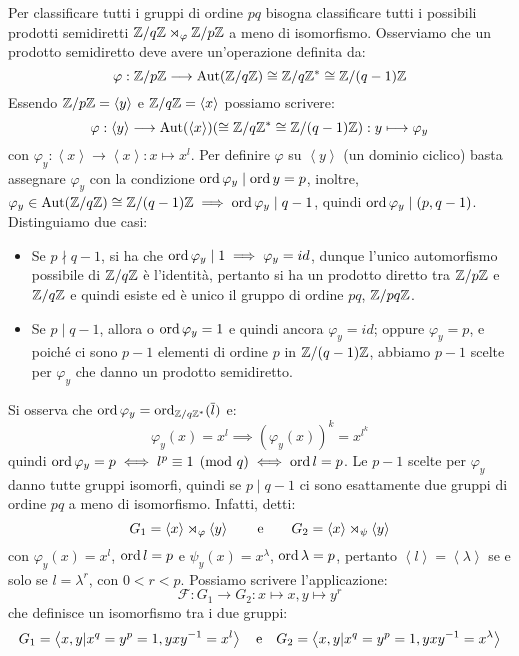 \documentclass[11pt]{scrartcl}
\begin{document}
Per classificare tutti i gruppi di ordine $pq$ bisogna classificare tutti i possibili prodotti semidiretti $\mathbb Z/q\mathbb Z \rtimes_{\varphi} {\mathbb Z}/p{\mathbb Z}$ a meno di isomorfismo.
Osserviamo che un prodotto semidiretto deve avere un'operazione definita da:
\[ \varphi : {\mathbb Z}/p{\mathbb Z} \longrightarrow \operatorname{Aut}(\mathbb Z/q\mathbb Z) \cong \mathbb Z/q\mathbb Z^* \cong \mathbb Z/(q-1)\mathbb Z
            \]
Essendo ${\mathbb Z}/p{\mathbb Z} = \left<y\right>$ e $\mathbb Z/q\mathbb Z = \left<x\right>$ possiamo scrivere:
    \[ \varphi : \left<y\right> \longrightarrow \operatorname{Aut}(\left<x\right>) (\cong \mathbb Z/q\mathbb Z^* \cong \mathbb Z/(q-1)\mathbb Z) : y \longmapsto \varphi_y
            \]
con $\varphi_y : \left<x\right> \longrightarrow \left<x\right> : x \longmapsto x^l$. Per definire $\varphi$ su $\left<y\right>$ (un dominio ciclico)
basta assegnare $\varphi_y$ con la condizione $\operatorname{ord} \varphi_y \mid \operatorname{ord} y = p$, inoltre, $\varphi_y \in \operatorname{Aut}(\mathbb{Z}/{q}\mathbb{Z}) \cong \mathbb{Z}/{(q-1)}\mathbb{Z} \implies \operatorname{ord} \varphi_y \mid q-1$, 
quindi $\operatorname{ord} \varphi_y \mid (p,q-1)$. Distinguiamo due casi:
    \begin{itemize}
        \item Se $p \nmid q-1$, si ha che $\operatorname{ord} \varphi_y \mid 1 \implies \varphi_y = id$, dunque l'unico automorfismo possibile di $\mathbb{Z}/{q}\mathbb{Z}$ è l'identità, pertanto si ha un prodotto diretto tra $\mathbb{Z}/{p}\mathbb{Z}$ e
            $\mathbb{Z}/{q}\mathbb{Z}$ e quindi esiste ed è unico il gruppo di ordine $pq$, $\mathbb{Z}/{pq}\mathbb{Z}$.  
        \item Se $p \mid q-1$, allora o $\operatorname{ord} \varphi_y = 1$ e quindi ancora $\varphi_y = id$; oppure $\varphi_y = p$, e poiché ci sono $p-1$ elementi di ordine $p$ in $\mathbb{Z}/{(q-1)}\mathbb{Z}$, abbiamo $p-1$
            scelte per $\varphi_y$ che danno un prodotto semidiretto.
    \end{itemize}
Si osserva che $\operatorname{ord} \varphi_y = \operatorname{ord}_{\mathbb{Z}/{q}\mathbb{Z}^*}(\overline l)$ e:
    \[ \varphi_y(x) = x^l \implies (\varphi_y(x))^k = x^{l^k}
        \]
quindi $\operatorname{ord} \varphi_y = p \iff l^p \equiv 1 \pmod q \iff \operatorname{ord} l = p$.
Le $p-1$ scelte per $\varphi_y$ danno tutte gruppi isomorfi, quindi se $p \mid q-1$ ci sono esattamente due gruppi di ordine $pq$ a meno di isomorfismo. Infatti, detti:
    \[ G_1 = \left<x\right> \rtimes_{\varphi} \left<y\right>
    \qquad \text e \qquad 
    G_2 = \left<x\right> \rtimes_{\psi} \left<y\right>
        \]
con $\varphi_y(x) = x^l$, $\operatorname{ord} l = p$ e $\psi_y(x) = x^\lambda$, $\operatorname{ord} \lambda = p$, pertanto $\left<l\right> = \left<\lambda\right>$ se e solo se 
$l = \lambda^r$, con $0 < r < p$. Possiamo scrivere l'applicazione:
    \[ \mathcal{F} : G_1 \longrightarrow G_2 : x \longmapsto x, y \longmapsto y^r
        \]
che definisce un isomorfismo tra i due gruppi:
    \[ G_1 = \left<x,y | x^q = y^p = 1, yxy^{-1} = x^l\right> \quad \text e \quad G_2 = \left<x,y | x^q = y^p = 1, yxy^{-1} = x^\lambda\right>
        \]
\end{document}
